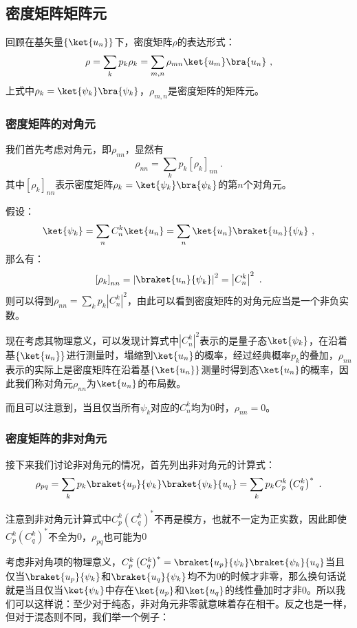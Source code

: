 \subsection{密度矩阵矩阵元}


回顾在基矢量$\left\{ \ket{u_n}\right\}$下，密度矩阵$\rho$的表达形式：
$$\rho = \sum\limits_k p_k\rho_k = \sum\limits_{m,n}\rho_{mn}\ket{u_m}\bra{u_n} ~,$$
上式中$\rho_k = \ket{\psi_k}\bra{\psi_k}$，$\rho_{m,n}$是密度矩阵的矩阵元。

\subsubsection{密度矩阵的对角元}

我们首先考虑对角元，即$\rho_{nn}$，显然有
$$\rho_{nn} = \sum\limits_{k} p_k \left[\rho_k\right]_{nn}~.$$
其中$\left[\rho_k\right]_{nn}$表示密度矩阵$\rho_k = \ket{\psi_k}\bra{\psi_k}$的第$n$个对角元。

假设：
$$\ket{\psi_k} = \sum\limits_n C_n^{k}\ket{u_n} = \sum\limits_n\ket{u_n}\braket{u_n}{\psi_k}~,$$
那么有：
$$\left[\rho_k\right]_{nn} = \left|\braket{u_n}{\psi_k}\right|^2 = \left| C_n^{k}\right|^2~.$$
则可以得到$\rho_{nn} = \sum\limits_k p_k \left|C_n^k\right|^2$，由此可以看到密度矩阵的对角元应当是一个非负实数。

现在考虑其物理意义，可以发现计算式中$\left| C_n^k \right|^2$表示的是量子态$\ket{\psi_k}$，在沿着基$\left\{\ket{u_n}\right\}$进行测量时，塌缩到$\ket{u_n}$的概率，经过经典概率$p_k$的叠加，$\rho_{nn}$表示的实际上是密度矩阵在沿着基$\left\{\ket{u_n}\right\}$测量时得到态$\ket{u_n}$的概率，因此我们称对角元$\rho_{nn}$为$\ket{u_n}$的布局数。

而且可以注意到，当且仅当所有$\psi_k$对应的$C_n^k$均为$0$时，$\rho_{nn} = 0$。

\subsubsection{密度矩阵的非对角元}

接下来我们讨论非对角元的情况，首先列出非对角元的计算式：
$$\rho_{pq} = \sum\limits_k p_k \braket{u_p}{\psi_k}\braket{\psi_k}{u_q} = \sum\limits_k p_k C_p^k \left(C_q^k\right)^*~.$$

注意到非对角元计算式中$C_p^k\left(C_q^k\right)^*$不再是模方，也就不一定为正实数，因此即使$C_p^k \left(C_q^k\right)^*$不全为$0$，$\rho_{pq}$也可能为$0$

考虑非对角项的物理意义，$C_p^k\left(C_q^k\right)^* = \braket{u_p}{\psi_k}\braket{\psi_k}{u_q}$当且仅当$\braket{u_p}{\psi_k}$和$\braket{u_q}{\psi_k}$均不为$0$的时候才非零，那么换句话说就是当且仅当$\ket{\psi_k}$中存在$\ket{u_p}$和$\ket{u_q}$的线性叠加时才非$0$。所以我们可以这样说：至少对于纯态，非对角元非零就意味着存在相干。反之也是一样，但对于混态则不同，我们举一个例子：

